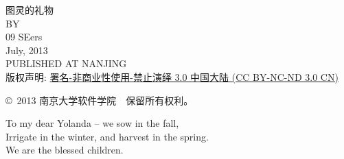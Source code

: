 \newpage
\clearpage
\begin{center}
\vspace*{\fill}
\Huge 图灵的礼物 \\
\vspace{3em}
\large BY \\
\large 09 SEers \\
\vspace*{\fill}
\vspace*{\fill}
\large July, 2013\\
PUBLISHED AT NANJING\\
\vspace*{\fill}
\fontsize{12pt}{2}\selectfont 版权声明: \href{http://creativecommons.org/licenses/by-nc-nd/3.0/cn/}{署名-非商业性使用-禁止演绎 3.0 中国大陆 (CC BY-NC-ND 3.0 CN)}\par
\fontsize{12pt}{2}\selectfont \copyright~2013 南京大学软件学院~~保留所有权利。
\end{center}
\clearpage
\newpage

\begin{center}
\vspace*{\fill}
To my dear Yolanda -- we sow in the fall,\\
Irrigate in the winter, and harvest in the spring.\\
We are the blessed children.
\vspace*{\fill}
\vspace*{\fill}
\end{center}
\clearpage